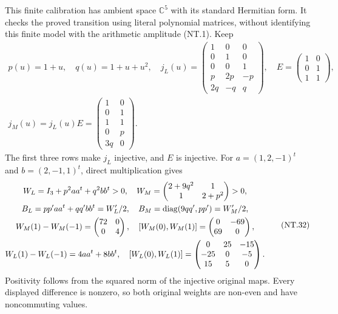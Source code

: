 This finite calibration has ambient space $\mathbb C^5$ with its
standard Hermitian form. It checks the proved transition using
literal polynomial matrices, without identifying this finite model
with the arithmetic amplitude (NT.1). Keep
\[
 \begin{gathered}
 p(u)=1+u,\quad q(u)=1+u+u^2,\quad
 j_L(u)=\begin{pmatrix}
 1&0&0\\0&1&0\\0&0&1\\p&2p&-p\\2q&-q&q
 \end{pmatrix},\quad
 E=\begin{pmatrix}1&0\\0&1\\1&1\end{pmatrix},\\
 j_M(u)=j_L(u)E=\begin{pmatrix}1&0\\0&1\\1&1\\0&p\\3q&0\end{pmatrix}.
 \end{gathered}
 \tag{NT.31}
\]
The first three rows make $j_L$ injective, and $E$ is injective.
For $a=(1,2,-1)^t$ and $b=(2,-1,1)^t$, direct multiplication gives
\[
 \begin{gathered}
 W_L=I_3+p^2aa^t+q^2bb^t>0,\quad
 W_M=\begin{pmatrix}2+9q^2&1\\1&2+p^2\end{pmatrix}>0,\\
 B_L=pp'aa^t+qq'bb^t=W_L'/2,\quad
 B_M=\operatorname{diag}(9qq',pp')=W_M'/2,\\
 W_M(1)-W_M(-1)=\begin{pmatrix}72&0\\0&4\end{pmatrix},\quad
 [W_M(0),W_M(1)]=\begin{pmatrix}0&-69\\69&0\end{pmatrix},\\
 W_L(1)-W_L(-1)=4aa^t+8bb^t,\quad
 [W_L(0),W_L(1)]=\begin{pmatrix}0&25&-15\\-25&0&-5\\15&5&0\end{pmatrix}.
 \end{gathered}
 \tag{NT.32}
\]
Positivity follows from the squared norm of the injective original
maps. Every displayed difference is nonzero, so both original
weights are non-even and have noncommuting values.

